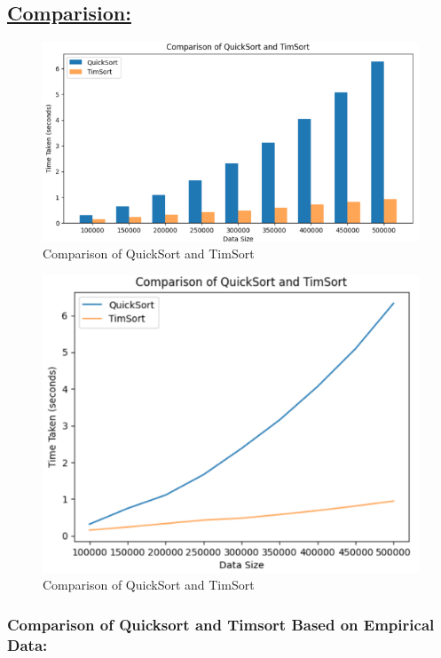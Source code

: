 \documentclass[a4paper, 9pt, twocolumn]{article}
\begin{document}
\subsection*{\underline{Comparision:}}
\begin{figure}[!hbt]
	\centering
	\includegraphics[width=0.8\linewidth]{comp1.png}  %
	\caption{Comparison of QuickSort and TimSort}
	\label{fig:comp1}
\end{figure}
\begin{figure}[!hbt]
	\centering
	\includegraphics[width=0.8\linewidth]{comp2.png}  %
	\caption{Comparison of QuickSort and TimSort}
	\label{fig:comp2}
\end{figure}

\subsubsection*{Comparison of Quicksort and Timsort Based on Empirical Data:}

\renewcommand{\thesubsubsection}{\roman{subsubsection}.} %
\setcounter{subsubsection}{0} %
\end{document}

